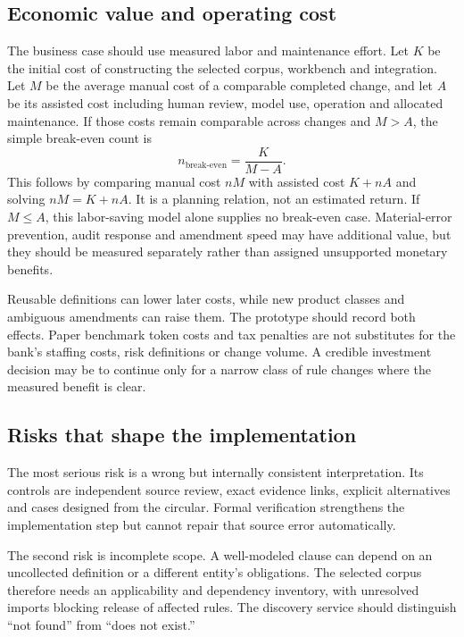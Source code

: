 \subsection{Economic value and operating cost}

The business case should use measured labor and maintenance effort. Let $K$ be
the initial cost of constructing the selected corpus, workbench and integration.
Let $M$ be the average manual cost of a comparable completed change, and let $A$
be its assisted cost including human review, model use, operation and allocated
maintenance. If those costs remain comparable across changes and $M>A$, the
simple break-even count is
\begin{equation}
 n_{\mathrm{break\text{-}even}}=\frac{K}{M-A}.
 \label{eq:cost}
\end{equation}
This follows by comparing manual cost $nM$ with assisted cost $K+nA$ and solving
$nM=K+nA$. It is a planning relation, not an estimated return. If $M\leq A$, this
labor-saving model alone supplies no break-even case. Material-error prevention,
audit response and amendment speed may have additional value, but they should be
measured separately rather than assigned unsupported monetary benefits.

Reusable definitions can lower later costs, while new product classes and
ambiguous amendments can raise them. The prototype should record both effects.
Paper benchmark token costs and tax penalties are not substitutes for the bank's
staffing costs, risk definitions or change volume. A credible investment decision
may be to continue only for a narrow class of rule changes where the measured
benefit is clear.

\subsection{Risks that shape the implementation}

The most serious risk is a wrong but internally consistent interpretation. Its
controls are independent source review, exact evidence links, explicit alternatives
and cases designed from the circular. Formal verification strengthens the
implementation step but cannot repair that source error automatically.

The second risk is incomplete scope. A well-modeled clause can depend on an
uncollected definition or a different entity's obligations. The selected corpus
therefore needs an applicability and dependency inventory, with unresolved imports
blocking release of affected rules. The discovery service should distinguish
``not found'' from ``does not exist.''

